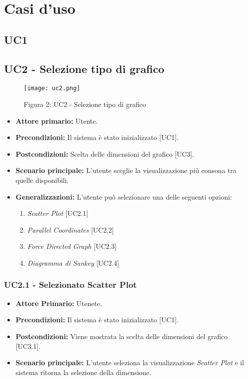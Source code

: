 \chapter{Casi d'uso}

\section{UC1}

\section{UC2 - Selezione tipo di grafico}
\begin{figure}[H]
 \texttt{[image: uc2.png]}
 \vspace{-5mm}
 \caption*{Figura 2: UC2 - Selezione tipo di grafico}
\end{figure}
 \begin{itemize}
     \item \textbf{Attore primario:} Utente.
     \item \textbf{Precondizioni:} Il sistema è stato inizializzato [UC1].
     \item \textbf{Postcondizioni:} Scelta delle dimensioni del grafico [UC3].
     \item \textbf{Scenario principale:} L'utente sceglie la visualizzazione più consona tra quelle disponibili.
     \item \textbf{Generalizzazioni:} L'utente può selezionare una delle seguenti opzioni:
     \begin{enumerate}
         \item \textit{Scatter Plot} [UC2.1]
         \item \textit{Parallel Coordinates} [UC2.2]
         \item \textit{Force Directed Graph} [UC2.3]
         \item \textit{Diagramma di Sankey} [UC2.4]
     \end{enumerate}
 \end{itemize}
 
 \subsection{UC2.1 - Selezionato Scatter Plot}
  \begin{itemize}
      \item \textbf{Attore Primario:} Utenete.
      \item \textbf{Precondizioni:} Il sistema è stato inizializzato [UC1].
      \item \textbf{Postcondizioni:} Viene mostrata la scelta delle dimensioni del grafico [UC3.1].
      \item \textbf{Scenario principale:} L'utente seleziona la visualizzazione \textit{Scatter Plot} e il sistema ritorna la selezione della dimensione.
  \end{itemize}
